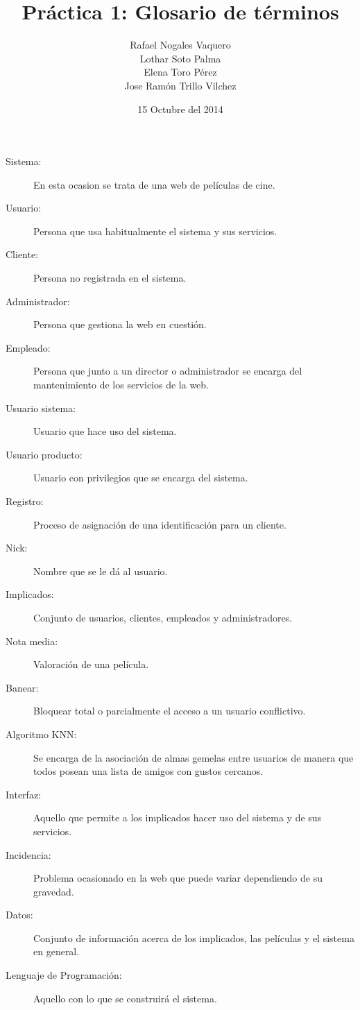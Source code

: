 \documentclass{article}
\title{Práctica 1: Glosario de términos}
\author{Rafael Nogales Vaquero
\\Lothar Soto Palma
\\Elena Toro Pérez
\\Jose Ramón Trillo Vilchez}
\date{15 Octubre del 2014}
\begin{document}
\maketitle

\begin{description}
\item[Sistema:] En esta ocasion se trata de una web de películas de cine.
\item[Usuario:] Persona que usa habitualmente el sistema y sus servicios.
\item[Cliente:] Persona no registrada en el sistema.
\item[Administrador:] Persona que gestiona la web en cuestión.
\item[Empleado:] Persona que junto a un director o administrador se encarga del mantenimiento de los servicios de la web.
\item[Usuario sistema:] Usuario que hace uso del sistema.
\item[Usuario producto:] Usuario con privilegios que se encarga del sistema.
\item[Registro:] Proceso de asignación de una identificación para un cliente.
\item[Nick:] Nombre que se le dá al usuario.
\item[Implicados:] Conjunto de usuarios, clientes, empleados y administradores.
\item[Nota media:] Valoración de una película.
\item[Banear:] Bloquear total o parcialmente el acceso a un usuario conflictivo.
\item[Algoritmo KNN:] Se encarga de la asociación de almas gemelas entre usuarios de manera que todos posean una lista de amigos con gustos cercanos.
\item[Interfaz:] Aquello que permite a los implicados hacer uso del sistema y de sus servicios.
\item[Incidencia:] Problema ocasionado en la web que puede variar dependiendo de su gravedad.
\item[Datos:] Conjunto de información acerca de los implicados, las películas y el sistema en general.
\item[Lenguaje de Programación:] Aquello con lo que se construirá el sistema.

\end{description}
\end{document}
